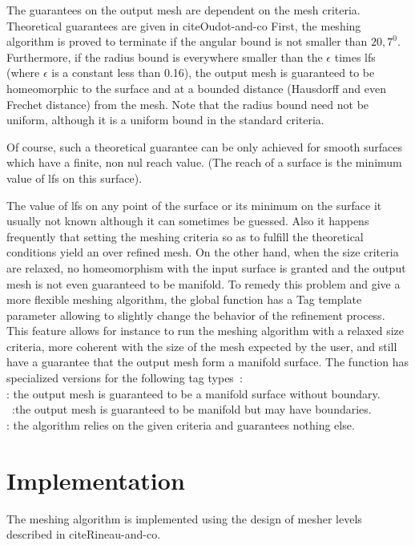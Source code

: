 The guarantees on the output mesh are dependent on the mesh criteria.
Theoretical guarantees are given in cite{Oudot-and-co}
First, the meshing algorithm is proved to terminate 
if the angular bound is
not smaller than $20,7^0$. 
Furthermore, if the radius bound is everywhere smaller than 
the $\epsilon$ times lfs  (where $\epsilon$ is a constant
less than 0.16),  the output mesh 
is guaranteed to be homeomorphic to the surface
and at a bounded distance (Hausdorff and even Frechet distance)
from the mesh.
Note that the radius bound need not be uniform,
although it is a uniform bound in the standard criteria.

Of course, such a theoretical guarantee can be only achieved
for smooth surfaces which have a finite, non nul
reach value. (The reach of a surface is the minimum value of lfs on
this surface).

The value of lfs on any point of the surface
or its minimum on the surface it usually not known
although it can sometimes be guessed. Also it happens frequently
that setting the meshing criteria so as to fulfill the theoretical
conditions yield an over refined mesh.
On the other hand, when the size criteria are relaxed,
no homeomorphism with the input surface is granted
and the output mesh is not even guaranteed to be manifold.
To remedy this problem and give a more flexible
meshing algorithm, the global function 
 has a Tag template parameter
allowing to slightly change the behavior of the refinement process.
This feature allows for instance to run the meshing
algorithm with a relaxed size criteria, more coherent
with the size of the mesh expected by the user,
and still have a guarantee that
the output mesh form a manifold surface.
The function  has specialized versions
for the following  tag types~: \\
 : the output mesh is guaranteed to be a manifold
surface without boundary.\\
~:the output mesh is guaranteed to be
manifold but may have boundaries.\\
 : the algorithm relies on the given criteria and
guarantees nothing else.

\section{Implementation}

The meshing algorithm is implemented using the design of mesher levels
described in cite{Rineau-and-co}. 




